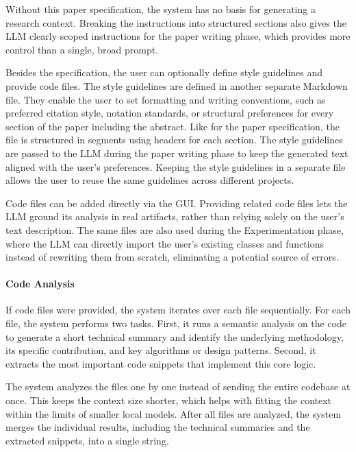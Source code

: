 Without this paper specification, the system has no basis for generating a research context. 
Breaking the instructions into structured sections also gives the LLM clearly scoped instructions for the paper writing phase, which provides more control than a single, broad prompt.

Besides the specification, the user can optionally define style guidelines and provide code files.  
The style guidelines are defined in another separate Markdown file.
They enable the user to set formatting and writing conventions, such as preferred citation style, notation standards, or structural preferences for every section of the paper including the abstract.
Like for the paper specification, the file is structured in segments using headers for each section.
The style guidelines are passed to the LLM during the paper writing phase to keep the generated text aligned with the user's preferences.
Keeping the style guidelines in a separate file allows the user to reuse the same guidelines across different projects.

Code files can be added directly via the GUI.
Providing related code files lets the LLM ground its analysis in real artifacts, rather than relying solely on the user's text description.
The same files are also used during the Experimentation phase, where the LLM can directly import the user's existing classes and functions instead of rewriting them from scratch, eliminating a potential source of errors.


\paragraph{Code Analysis}
If code files were provided, the system iterates over each file sequentially. 
For each file, the system performs two tasks. 
First, it runs a semantic analysis on the code to generate a short technical summary and identify the underlying methodology, its specific contribution, and key algorithms or design patterns. 
Second, it extracts the most important code snippets that implement this core logic. 

The system analyzes the files one by one instead of sending the entire codebase at once. 
This keeps the context size shorter, which helps with fitting the context within the limits of smaller local models. 
After all files are analyzed, the system merges the individual results, including the technical summaries and the extracted snippets, into a single string.


